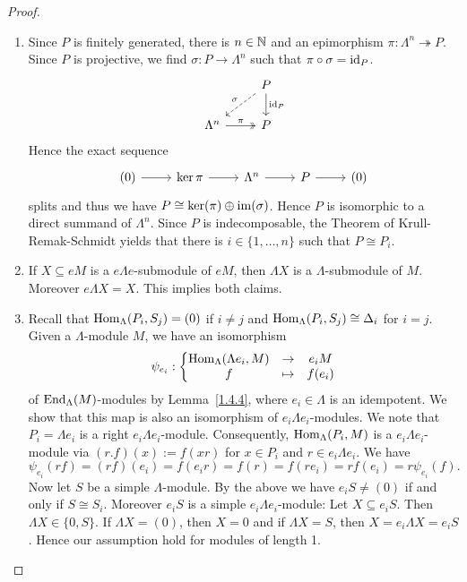 \begin{proof}\
\begin{enumerate}
\item Since $P$ is finitely generated, there is $n\in\mathbb{N}$ and an epimorphism $\pi:\Lambda^n\twoheadrightarrow P$. Since $P$ is projective, we find $\sigma:P\to \Lambda^n$ such that $\pi\circ\sigma = \operatorname{id}_P$.
%
\[
\begin{tikzcd}
	& P \ar[d,"\id_P"] \ar[ld,dashed,"\sigma"'] \\
	\Lambda^n \ar[r,two heads,"\pi"] & P
\end{tikzcd}
\]
%
Hence the exact sequence
\[
\begin{tikzcd}
	(0) \ar[r] & \ker \pi \ar[r] & \Lambda^n \ar[r] & P \ar[r] & (0)
\end{tikzcd}
\]
splits and thus we have $P\cong \ker(\pi)\oplus \operatorname{im}(\sigma)$. Hence $P$ is isomorphic to a direct summand of $\Lambda^n$. Since $P$ is indecomposable, the Theorem of Krull-Remak-Schmidt yields that there is $i\in\{1,\dots,n\}$ such that $P\cong P_i$.

\item If $X\subseteq eM$ is a $e\Lambda e$-submodule of $eM$, then $\Lambda X$ is a $\Lambda$-submodule of $M$. Moreover $e\Lambda X=X$. This implies both claims.

\item Recall that $\operatorname{Hom}_\Lambda(P_i,S_j)=(0)$ if $i\neq j$ and $\operatorname{Hom}_\Lambda(P_i,S_j)\cong \Delta_i$ for $i=j$. Given a $\Lambda$-module $M$, we have an isomorphism
\[
\psi_{e_i}:
\left\{ \begin{matrix} \operatorname{Hom}_\Lambda(\Lambda e_i,M) & \to & e_i M \\ f & \mapsto & f(e_i) \end{matrix} \right.
\]
of $\operatorname{End}_\Lambda(M)$-modules by Lemma~\ref{1.4.4}, where $e_i\in\Lambda$ is an idempotent. We show that this map is also an isomorphism of $e_i\Lambda e_i$-modules. We note that $P_i=\Lambda e_i$ is a right $e_i \Lambda e_i$-module. Consequently, $\operatorname{Hom}_\Lambda(P_i,M)$ is a $e_i \Lambda e_i$-module via $(r.f)(x):=f(xr)$ for $x\in P_i$ and $r\in e_i \Lambda e_i$. We have
\[
\psi_{e_i}(rf) = (rf)(e_i) = f(e_i r) = f(r) = f(r e_i) = r f(e_i) = r \psi_{e_i}(f). 
\]
Now let $S$ be a simple $\Lambda$-module. By the above we have $e_i S\neq (0)$ if and only if $S\cong S_i$. Moreover $e_i S$ is a simple $e_i \Lambda e_i$-module: Let $X\subseteq e_i S$. Then $\Lambda X \in \{0,S\}$. If $\Lambda X=(0)$, then $X=0$ and if $\Lambda X=S$, then $X = e_i\Lambda X=e_i S$. Hence our assumption hold for modules of length 1.


\end{enumerate}
\end{proof}

